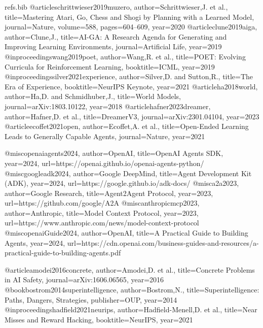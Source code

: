 \begin{filecontents*}{refs.bib}
@article{schrittwieser2019muzero, author={Schrittwieser,J. et al.},
  title={Mastering Atari, Go, Chess and Shogi by Planning with a Learned Model},
  journal={Nature}, volume={588}, pages={604–609}, year={2020}}
@article{clune2019aiga, author={Clune,J.},
  title={AI-GA: A Research Agenda for Generating and Improving Learning Environments},
  journal={Artificial Life}, year={2019}}
@inproceedings{wang2019poet, author={Wang,R. et al.},
  title={POET: Evolving Curricula for Reinforcement Learning},
  booktitle={ICML}, year={2019}}
@inproceedings{silver2021experience, author={Silver,D. and Sutton,R.},
  title={The Era of Experience}, booktitle={NeurIPS Keynote}, year={2021}}
@article{ha2018world, author={Ha,D. and Schmidhuber,J.},
  title={World Models}, journal={arXiv:1803.10122}, year={2018}}
@article{hafner2023dreamer, author={Hafner,D. et al.},
  title={DreamerV3}, journal={arXiv:2301.04104}, year={2023}}
@article{ecoffet2021open, author={Ecoffet,A. et al.},
  title={Open-Ended Learning Leads to Generally Capable Agents}, journal={Nature}, year={2021}}

@misc{openaiagents2024, author={OpenAI},
  title={OpenAI Agents SDK}, year={2024},
  url={https://openai.github.io/openai-agents-python/}}
@misc{googleadk2024, author={Google DeepMind},
  title={Agent Development Kit (ADK)}, year={2024},
  url={https://google.github.io/adk-docs/}}
@misc{a2a2023, author={Google Research},
  title={Agent2Agent Protocol}, year={2023}, url={https://github.com/google/A2A}}
@misc{anthropicmcp2023, author={Anthropic},
  title={Model Context Protocol}, year={2023},
  url={https://www.anthropic.com/news/model-context-protocol}}
@misc{openaiGuide2024, author={OpenAI},
  title={A Practical Guide to Building Agents}, year={2024},
  url={https://cdn.openai.com/business-guides-and-resources/a-practical-guide-to-building-agents.pdf}}

@article{amodei2016concrete, author={Amodei,D. et al.},
  title={Concrete Problems in AI Safety}, journal={arXiv:1606.06565}, year={2016}}
@book{bostrom2014superintelligence, author={Bostrom,N.},
  title={Superintelligence: Paths, Dangers, Strategies}, publisher={OUP}, year={2014}}
@inproceedings{hadfield2021neurips, author={Hadfield-Menell,D. et al.},
  title={Near Misses and Reward Hacking}, booktitle={NeurIPS}, year={2021}}


\end{filecontents*}
